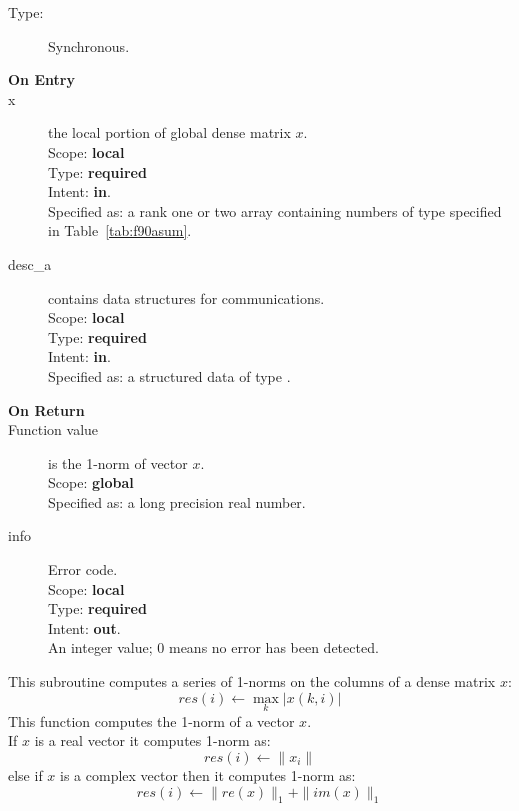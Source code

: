 \begin{description}
\item[Type:] Synchronous.
\item[\bf On Entry]
\item[x] the local portion of global dense matrix
$x$. %
\\
Scope: {\bf local} \\
Type: {\bf required} \\
Intent: {\bf in}.\\
Specified as: a rank one or two array 
containing numbers of type specified in
Table~\ref{tab:f90asum}.
\item[desc\_a] contains data structures for communications.\\
Scope: {\bf local} \\
Type: {\bf required}\\
Intent: {\bf in}.\\
Specified as: a structured data of type \descdata.

\item[\bf On Return] 
\item[Function value] is the 1-norm of vector $x$.\\
Scope: {\bf global} \\
Specified as: a long precision real  number.
\item[info] Error code.\\
Scope: {\bf local} \\
Type: {\bf required} \\
Intent: {\bf out}.\\
An integer value; 0 means no error has been detected. 
\end{description}



This subroutine computes a series of  1-norms on the columns of
a  dense matrix  $x$: 
\[ res(i) \leftarrow \max_k |x(k,i)| \]
This function computes the 1-norm of a vector $x$.\\
If $x$ is a real vector 
it computes 1-norm as:
\[ res(i) \leftarrow  \|x_i\|\]
else if $x$ is a complex vector then it computes 1-norm  as:
\[ res(i) \leftarrow \|re(x)\|_1 + \|im(x)\|_1\]



